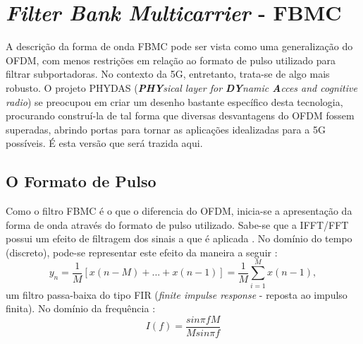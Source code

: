 \chapter{\textit{Filter Bank Multicarrier} - FBMC} \label{capitulo3}




A descrição da forma de onda FBMC pode ser vista como uma generalização do OFDM, com menos restrições em relação ao formato de pulso utilizado para filtrar subportadoras. No contexto da 5G, entretanto, trata-se de algo mais robusto. O projeto PHYDAS (\textit{\textbf{PHY}sical layer for \textbf{DY}namic \textbf{A}cces and cognitive radio}) \cite{phydas} se preocupou em criar um desenho bastante específico desta tecnologia, procurando construí-la de tal forma que diversas desvantagens do OFDM fossem superadas, abrindo portas para tornar as aplicações idealizadas para a 5G possíveis. É esta versão que será trazida aqui. 


\section{O Formato de Pulso}\label{pulso} 

Como o filtro FBMC é o que o diferencia do OFDM, inicia-se a apresentação da forma de onda através do formato de pulso utilizado. Sabe-se que a IFFT/FFT possui um efeito de filtragem dos sinais a que é aplicada \cite{Boroujeny}. No domínio do tempo (discreto), pode-se representar este efeito da maneira a seguir \cite{Bellanger}:
\begin{equation}
y_{n} = \frac{1}{M}[x(n-M)+...+x(n-1)] = \frac{1}{M}\sum_{i=1}^{M}x(n-1),
\end{equation}
um filtro passa-baixa do tipo FIR (\textit{finite impulse response} - reposta ao impulso finita). No domínio da frequência \cite{Bellanger}:
\begin{equation}\label{eq_freq}
I(f) = \frac{sin\pi fM}{Msin\pi f}
\end{equation}

